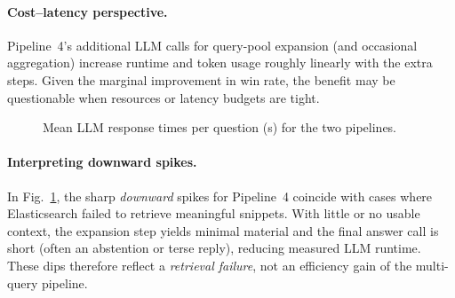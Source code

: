 \documentclass[manuscript,screen]{acmart}
\begin{document}
\begin{CCSXML}
\paragraph{Cost–latency perspective.}
Pipeline~4’s additional LLM calls for query-pool expansion (and occasional
aggregation) increase runtime and token usage roughly linearly with the extra
steps. Given the marginal improvement in win rate, the benefit may be
questionable when resources or latency budgets are tight.

\begin{figure}[H]
\centering
{}
\caption{Mean LLM response times per question (s) for the two pipelines.}
\label{fig:time-per-question}
\end{figure}

\paragraph{Interpreting downward spikes.}
In Fig.~\ref{fig:time-per-question}, the sharp \emph{downward} spikes for
Pipeline~4 coincide with cases where Elasticsearch failed to retrieve
meaningful snippets. With little or no usable context, the expansion step
yields minimal material and the final answer call is short (often an abstention
or terse reply), reducing measured LLM runtime. These dips therefore reflect a
\emph{retrieval failure}, not an efficiency gain of the multi-query
pipeline.


\end{CCSXML}
\end{document}
